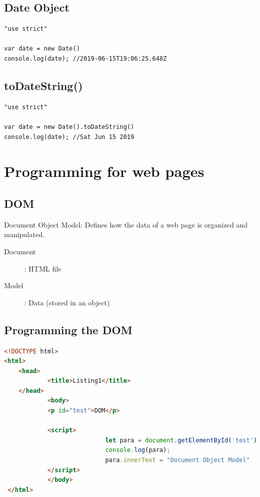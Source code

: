 \documentclass[10pt, a4paper, twocolumn]{article}
\begin{document}
\subsection{Date Object}

\begin{lstlisting}
"use strict"

var date = new Date()
console.log(date); //2019-06-15T19:06:25.648Z

\end{lstlisting}

\subsection{toDateString()}

\begin{lstlisting}
"use strict"

var date = new Date().toDateString()
console.log(date); //Sat Jun 15 2019
\end{lstlisting}

\section{Programming for web pages}

\subsection{DOM}

Document Object Model: Defines how the data of a web page is organized and manipulated.

\begin{description}
	\item[Document] : HTML file
	\item[Model]:  Data (stored in an object)
\end{description}

\subsection{Programming the DOM}

\begin{lstlisting}[language=HTML]
<!DOCTYPE html>
<html>
	<head>
			<title>Listing1</title>
	</head>
			<body>
			<p id="test">DOM</p>

			<script>
							let para = document.getElementById('test')
							console.log(para);
							para.innerText = "Document Object Model"
			</script>
			</body>
 </html>
\end{lstlisting}
\end{document}
